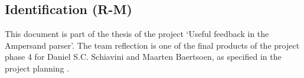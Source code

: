 
\subsection{Identification (R-M)}
This document is part of the thesis of the project `Useful feedback in the Ampersand parser'.
The team reflection is one of the final products of the project phase 4 for Daniel S.C. Schiavini and Maarten Baertsoen, as specified in the project planning .
